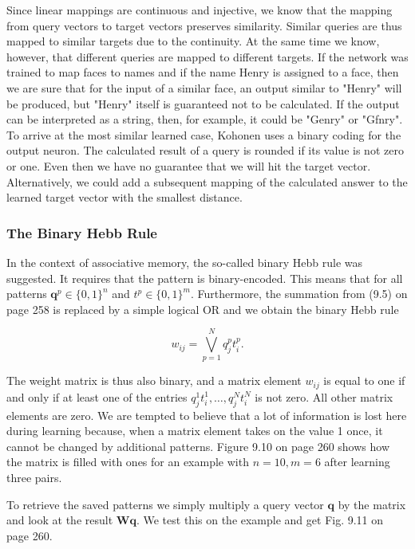 \documentclass[10pt]{book}
\begin{document}
Since linear mappings are continuous and injective, we know that the mapping from query vectors to target vectors preserves similarity. Similar queries are thus mapped to similar targets due to the continuity. At the same time we know, however, that different queries are mapped to different targets. If the network was trained to map faces to names and if the name Henry is assigned to a face, then we are sure that for the input of a similar face, an output similar to "Henry" will be produced, but "Henry" itself is guaranteed not to be calculated. If the output can be interpreted as a string, then, for example, it could be "Genry" or "Gfnry". To arrive at the most similar learned case, Kohonen uses a binary coding for the output neuron. The calculated result of a query is rounded if its value is not zero or one. Even then we have no guarantee that we will hit the target vector. Alternatively, we could add a subsequent mapping of the calculated answer to the learned target vector with the smallest distance.

\subsubsection*{The Binary Hebb Rule}
In the context of associative memory, the so-called binary Hebb rule was suggested. It requires that the pattern is binary-encoded. This means that for all patterns $\boldsymbol{q}^{p} \in \{0,1\}^{n}$ and $t^{p} \in\{0,1\}^{m}$. Furthermore, the summation from (9.5) on page 258 is replaced by a simple logical OR and we obtain the binary Hebb rule


\begin{equation*}
w_{i j}=\bigvee_{p=1}^{N} q_{j}^{p} t_{i}^{p} . \tag{9.10}
\end{equation*}


The weight matrix is thus also binary, and a matrix element $w_{i j}$ is equal to one if and only if at least one of the entries $q_{j}^{1} t_{i}^{1}, \ldots, q_{j}^{N} t_{i}^{N}$ is not zero. All other matrix elements are zero. We are tempted to believe that a lot of information is lost here during learning because, when a matrix element takes on the value 1 once, it cannot be changed by additional patterns. Figure 9.10 on page 260 shows how the matrix is filled with ones for an example with $n=10, m=6$ after learning three pairs.

To retrieve the saved patterns we simply multiply a query vector $\boldsymbol{q}$ by the matrix and look at the result $\boldsymbol{W q}$. We test this on the example and get Fig. 9.11 on page 260.
\end{document}
